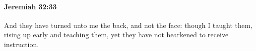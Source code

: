 
		\paragraph{Jeremiah 32:33} %
			\label{JEREMIAH-32-33}

			And they have turned unto me the back, and not the face: though I taught them, rising up early and teaching them, yet they have not hearkened to receive instruction.



